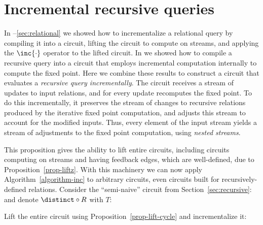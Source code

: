 \section{Incremental recursive queries}\label{sec:inc-recursive}

In --\ref{sec:relational}
we showed how to incrementalize a relational query by
compiling it into a circuit, lifting the circuit to compute on streams, and
applying the $\inc{\cdot}$ operator to the lifted circuit.  In  we showed
how to compile a recursive query into a circuit that employs incremental
computation internally to compute the fixed point.
Here we combine these results to construct a circuit that evaluates a \emph{recursive
query incrementally}.  The circuit receives a stream of updates to input
relations, and for every update recomputes the fixed point.  To do this
incrementally, it preserves the stream of changes to recursive relations
produced by the iterative fixed point computation, and adjusts this stream to
account for the modified inputs.  Thus, every element of the input stream yields
a stream of adjustments to the fixed point computation, using
\emph{nested streams}.

This proposition gives the ability to lift
entire circuits, including circuits computing on streams and having feedback edges,
which are well-defined, due to Proposition~\ref{prop-liftz}.
With this machinery we can now apply Algorithm~\ref{algorithm-inc} to arbitrary
circuits, even circuits built for recursively-defined relations.
Consider the ``semi-naive'' circuit from Section~\ref{sec:recursive}:
and denote $\distinct \circ R$ with $T$:

\begin{center}
\end{center}

\noindent Lift the entire circuit using Proposition~\ref{prop-lift-cycle} and incrementalize it:

